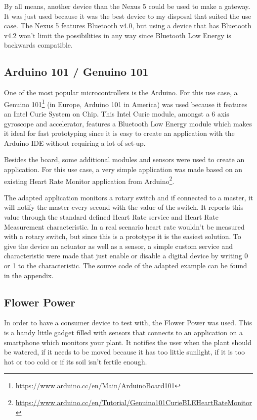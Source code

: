 \documentclass[pdftex,a4paper,12pt,twoside]{report}
\begin{document}
By all means, another device than the Nexus 5 could be used to make a gateway. It was just used because it was the best device to my disposal that suited the use case. The Nexus 5 features Bluetooth v4.0, but using a device that has Bluetooth v4.2 won't limit the possibilities in any way since Bluetooth Low Energy is backwards compatible.

\subsection{Arduino 101 / Genuino 101}
\label{subsec:arduino101}
One of the most popular microcontrollers is the Arduino. For this use case, a Genuino 101\footnote{\url{https://www.arduino.cc/en/Main/ArduinoBoard101}} (in Europe, Arduino 101 in America) was used because it features an Intel Curie System on Chip. This Intel Curie module, amongst a 6 axis gyroscope and accelerator, features a Bluetooth Low Energy module which makes it ideal for fast prototyping since it is easy to create an application with the Arduino IDE without requiring a lot of set-up.

Besides the board, some additional modules and sensors were used to create an application. For this use case, a very simple application was made based on an existing Heart Rate Monitor application from Arduino\footnote{\url{https://www.arduino.cc/en/Tutorial/Genuino101CurieBLEHeartRateMonitor}}.

The adapted application monitors a rotary switch and if connected to a master, it will notify the master every second with the value of the switch. It reports this value through the standard defined Heart Rate service and Heart Rate Measurement characteristic. In a real scenario heart rate wouldn't be measured with a rotary switch, but since this is a prototype it is the easiest solution. To give the device an actuator as well as a sensor, a simple custom service and characteristic were made that just enable or disable a digital device by writing 0 or 1 to the characteristic. The source code of the adapted example can be found in the appendix.

\subsection{Flower Power}
\label{subsec:flowerpower}
In order to have a consumer device to test with, the Flower Power was used. This is a handy little gadget filled with sensors that connects to an application on a smartphone which monitors your plant. It notifies the user when the plant should be watered, if it needs to be moved because it has too little sunlight, if it is too hot or too cold or if its soil isn't fertile enough.
\end{document}
